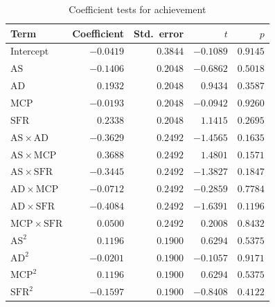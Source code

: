 \documentclass[12pt]{article}
\begin{document}
\begin{table}[htbp]
\centering
\small
\caption{Coefficient tests for achievement}
\label{tab:coef-achievement}
\begin{tabular}{lrrrr}
\toprule
Term & Coefficient & Std.\ error & $t$ & $p$ \\
\midrule
Intercept                         & $-0.0419$ & $0.3844$ & $-0.1089$ & $0.9145$ \\
$\mathrm{AS}$                     & $-0.1406$ & $0.2048$ & $-0.6862$ & $0.5018$ \\
$\mathrm{AD}$                     & $ 0.1932$ & $0.2048$ & $ 0.9434$ & $0.3587$ \\
$\mathrm{MCP}$                    & $-0.0193$ & $0.2048$ & $-0.0942$ & $0.9260$ \\
$\mathrm{SFR}$                    & $ 0.2338$ & $0.2048$ & $ 1.1415$ & $0.2695$ \\
$\mathrm{AS}\times\mathrm{AD}$    & $-0.3629$ & $0.2492$ & $-1.4565$ & $0.1635$ \\
$\mathrm{AS}\times\mathrm{MCP}$   & $ 0.3688$ & $0.2492$ & $ 1.4801$ & $0.1571$ \\
$\mathrm{AS}\times\mathrm{SFR}$   & $-0.3445$ & $0.2492$ & $-1.3827$ & $0.1847$ \\
$\mathrm{AD}\times\mathrm{MCP}$   & $-0.0712$ & $0.2492$ & $-0.2859$ & $0.7784$ \\
$\mathrm{AD}\times\mathrm{SFR}$   & $-0.4084$ & $0.2492$ & $-1.6391$ & $0.1196$ \\
$\mathrm{MCP}\times\mathrm{SFR}$  & $ 0.0500$ & $0.2492$ & $ 0.2008$ & $0.8432$ \\
$\mathrm{AS}^{2}$                 & $ 0.1196$ & $0.1900$ & $ 0.6294$ & $0.5375$ \\
$\mathrm{AD}^{2}$                 & $-0.0201$ & $0.1900$ & $-0.1057$ & $0.9171$ \\
$\mathrm{MCP}^{2}$                & $ 0.1196$ & $0.1900$ & $ 0.6294$ & $0.5375$ \\
$\mathrm{SFR}^{2}$                & $-0.1597$ & $0.1900$ & $-0.8408$ & $0.4122$ \\
\bottomrule
\end{tabular}

\medskip

\end{table}
\end{document}
